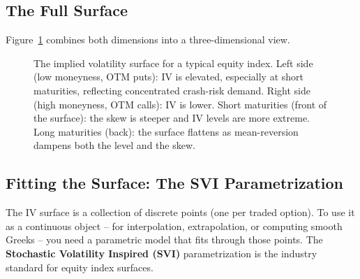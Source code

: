 \subsection{The Full Surface}
\label{sec:full-surface}

Figure~\ref{fig:iv-surface-3d} combines both dimensions into a three-dimensional view.

\begin{figure}[htbp]
\centering
{}
\caption{The implied volatility surface for a typical equity index.
Left side (low moneyness, OTM puts): IV is elevated, especially at short maturities, reflecting concentrated crash-risk demand.
Right side (high moneyness, OTM calls): IV is lower.
Short maturities (front of the surface): the skew is steeper and IV levels are more extreme.
Long maturities (back): the surface flattens as mean-reversion dampens both the level and the skew.}
\label{fig:iv-surface-3d}
\end{figure}

\subsection{Fitting the Surface: The SVI Parametrization}\label{sec:svi}

The IV surface is a collection of discrete points (one per traded option).
To use it as a continuous object -- for interpolation, extrapolation, or computing smooth Greeks -- you need a parametric model that fits through those points.
The \textbf{Stochastic Volatility Inspired (SVI)} parametrization \citep{GatheralJacquier2014} is the industry standard for equity index surfaces.


